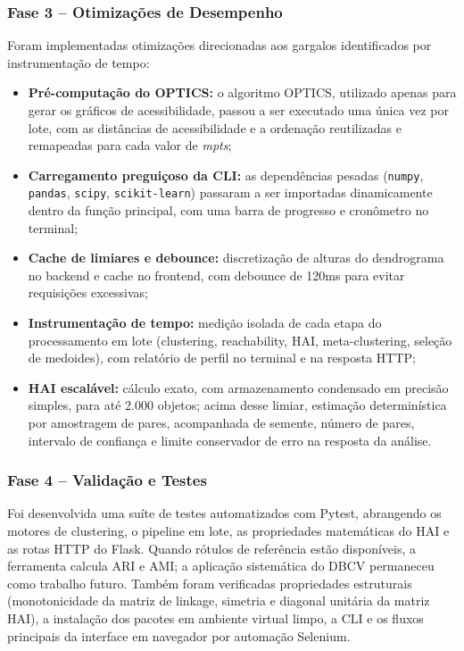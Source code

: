 \documentclass[12pt,a4paper,oneside]{article}
\begin{document}
\subsubsection{Fase 3 -- Otimizações de Desempenho}

Foram implementadas otimizações direcionadas aos gargalos identificados por instrumentação de
tempo:

\begin{itemize}
  \item \textbf{Pré-computação do OPTICS:} o algoritmo OPTICS, utilizado apenas para gerar os
        gráficos de acessibilidade, passou a ser executado uma única vez por lote, com as
        distâncias de acessibilidade e a ordenação reutilizadas e remapeadas para cada valor de
        \textit{mpts};
  \item \textbf{Carregamento preguiçoso da CLI:} as dependências pesadas (\texttt{numpy},
        \texttt{pandas}, \texttt{scipy}, \texttt{scikit-learn}) passaram a ser importadas
        dinamicamente dentro da função principal, com uma barra de progresso e cronômetro no
        terminal;
  \item \textbf{Cache de limiares e debounce:} discretização de alturas do dendrograma no
        backend e cache no frontend, com debounce de 120ms para evitar requisições excessivas;
  \item \textbf{Instrumentação de tempo:} medição isolada de cada etapa do processamento em
        lote (clustering, reachability, HAI, meta-clustering, seleção de medoides), com
        relatório de perfil no terminal e na resposta HTTP;
  \item \textbf{HAI escalável:} cálculo exato, com armazenamento condensado em precisão
        simples, para até 2.000 objetos; acima desse limiar, estimação determinística por
        amostragem de pares, acompanhada de semente, número de pares, intervalo de confiança e
        limite conservador de erro na resposta da análise.
\end{itemize}

\subsubsection{Fase 4 -- Validação e Testes}

Foi desenvolvida uma suíte de testes automatizados com Pytest, abrangendo os motores de
clustering, o pipeline em lote, as propriedades matemáticas do HAI e as rotas HTTP do Flask.
Quando rótulos de referência estão disponíveis, a ferramenta calcula ARI e AMI; a aplicação
sistemática do DBCV permaneceu como trabalho futuro. Também foram verificadas propriedades
estruturais (monotonicidade da matriz de linkage, simetria e diagonal unitária da matriz HAI),
a instalação dos pacotes em ambiente virtual limpo, a CLI e os fluxos principais da interface
em navegador por automação Selenium.
\end{document}
